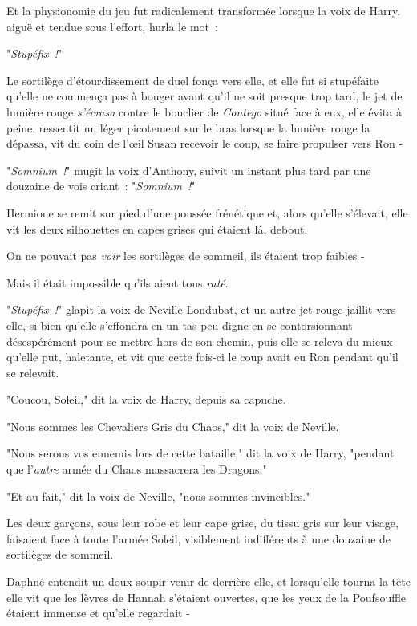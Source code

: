 Et la physionomie du jeu fut radicalement transformée lorsque la voix de Harry, aiguë et tendue sous l'effort, hurla le mot~:

"\emph{Stupéfix~!}"

Le sortilège d'étourdissement de duel fonça vers elle, et elle fut si stupéfaite qu'elle ne commença pas à bouger avant qu'il ne soit presque trop tard, le jet de lumière rouge \emph{s'écrasa} contre le bouclier de \emph{Contego} situé face à eux, elle évita à peine, ressentit un léger picotement sur le bras lorsque la lumière rouge la dépassa, vit du coin de l'œil Susan recevoir le coup, se faire propulser vers Ron -

"\emph{Somnium~!}" mugit la voix d'Anthony, suivit un instant plus tard par une douzaine de vois criant~: "\emph{Somnium~!}"

Hermione se remit sur pied d'une poussée frénétique et, alors qu'elle s'élevait, elle vit les deux silhouettes en capes grises qui étaient là, debout.

On ne pouvait pas \emph{voir} les sortilèges de sommeil, ils étaient trop faibles -

Mais il était impossible qu'ils aient tous \emph{raté}.

"\emph{Stupéfix~!}" glapit la voix de Neville Londubat, et un autre jet rouge jaillit vers elle, si bien qu'elle s'effondra en un tas peu digne en se contorsionnant désespérément pour se mettre hors de son chemin, puis elle se releva du mieux qu'elle put, haletante, et vit que cette fois-ci le coup avait eu Ron pendant qu'il se relevait.

"Coucou, Soleil," dit la voix de Harry, depuis sa capuche.

"Nous sommes les Chevaliers Gris du Chaos," dit la voix de Neville.

"Nous serons vos ennemis lors de cette bataille," dit la voix de Harry, "pendant que l'\emph{autre} armée du Chaos massacrera les Dragons."

"Et au fait," dit la voix de Neville, "nous sommes invincibles."

\later

Les deux garçons, sous leur robe et leur cape grise, du tissu gris sur leur visage, faisaient face à toute l'armée Soleil, visiblement indifférents à une douzaine de sortilèges de sommeil.

Daphné entendit un doux soupir venir de derrière elle, et lorsqu'elle tourna la tête elle vit que les lèvres de Hannah s'étaient ouvertes, que les yeux de la Poufsouffle étaient immense et qu'elle regardait -

